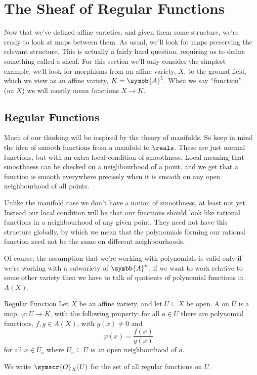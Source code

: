 \documentclass[fleqn]{NotesClass}
\newcommand{\affine}{\symbb{A}}
\newcommand{\sheaf}[1]{\symscr{#1}}
\begin{document}
    \chapter{The Sheaf of Regular Functions}
    Now that we've defined affine varieties, and given them some structure, we're ready to look at maps between them.
    As usual, we'll look for maps preserving the relevant structure.
    This is actually a fairly hard question, requiring us to define something called a sheaf.
    For this section we'll only consider the simplest example, we'll look for morphisms from an affine variety, \(X\), to the ground field, which we view as an affine variety, \(K = \affine^1\).
    When we say \enquote{function} (on \(X\)) we will mostly mean functions \(X \to K\).
    
    \section{Regular Functions}
    Much of our thinking will be inspired by the theory of manifolds.
    So keep in mind the idea of smooth functions from a manifold to \(\reals\).
    These are just normal functions, but with an extra local condition of smoothness.
    Local meaning that smoothness can be checked on a neighbourhood of a point, and we get that a function is smooth everywhere precisely when it is smooth on any open neighbourhood of all points.
    
    Unlike the manifold case we don't have a notion of smoothness, at least not yet.
    Instead our local condition will be that our functions should look like rational functions in a neighbourhood of any given point.
    They need not have this structure globally, by which we mean that the polynomials forming our rational function need not be the same on different neighbourhoods.
    
    Of course, the assumption that we're working with polynomials is valid only if we're working with a subvariety of \(\affine^n\), if we want to work relative to some other variety then we have to talk of quotients of polynomial functions in \(A(X)\).
    
    \begin{dfn}{Regular Function}{}
        Let \(X\) be an affine variety, and let \(U \subseteq X\) be open.
        A  on \(U\) is a map, \(\varphi \colon U \to K\), with the following property: for all \(a \in U\) there are polynomial functions, \(f, g \in A(X)\), with \(g(x) \ne 0\) and
        \begin{equation}
            \varphi(x) = \frac{f(x)}{g(x)}
        \end{equation}
        for all \(x \in U_a\) where \(U_a \subseteq U\) is an open neighbourhood of \(a\).
        
        We write \(\sheaf{O}_X(U)\) for the set of all regular functions on \(U\).
    \end{dfn}
    
\end{document}
